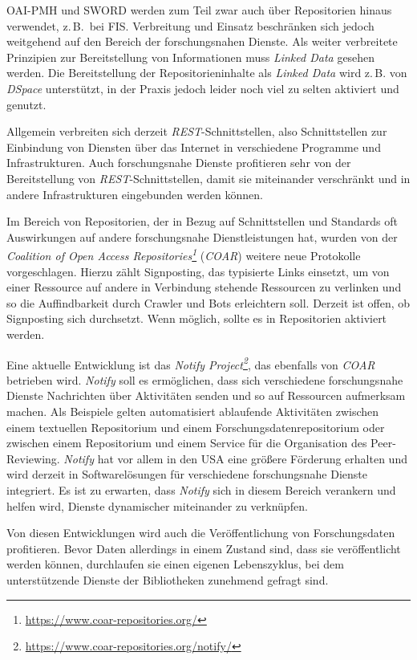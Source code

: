 \documentclass[
  11pt,
  letterpaper,
  DIV=11,
  twoside]{scrreprt}
\DeclareRobustCommand{\href}[2]{#2\footnote{\url{#1}}}
\begin{document}
{OAI-PMH} und {SWORD} werden zum Teil zwar auch über Repositorien hinaus
verwendet, z.\,B.~bei {FIS}. Verbreitung und Einsatz beschränken sich
jedoch weitgehend auf den Bereich der forschungsnahen Dienste. Als
weiter verbreitete Prinzipien zur Bereitstellung von Informationen muss
\emph{Linked Data} gesehen werden. Die Bereitstellung der
Repositorieninhalte als \emph{Linked Data} wird z.\,B. von \emph{DSpace}
unterstützt, in der Praxis jedoch leider noch viel zu selten aktiviert
und genutzt.

Allgemein verbreiten sich derzeit \emph{REST}-Schnittstellen, also
Schnittstellen zur Einbindung von Diensten über das Internet in
verschiedene Programme und Infrastrukturen. Auch forschungsnahe Dienste
profitieren sehr von der Bereitstellung von \emph{REST}-Schnittstellen,
damit sie miteinander verschränkt und in andere Infrastrukturen
eingebunden werden können.

Im Bereich von Repositorien, der in Bezug auf Schnittstellen und
Standards oft Auswirkungen auf andere forschungsnahe Dienstleistungen
hat, wurden von der
\emph{\href{https://www.coar-repositories.org/}{Coalition of Open Access
Repositories}} (\emph{COAR}) weitere neue Protokolle vorgeschlagen.
Hierzu zählt Signposting, das typisierte Links einsetzt, um von einer
Ressource auf andere in Verbindung stehende Ressourcen zu verlinken und
so die Auffindbarkeit durch Crawler und Bots erleichtern soll. Derzeit
ist offen, ob Signposting sich durchsetzt. Wenn möglich, sollte es in
Repositorien aktiviert werden.

Eine aktuelle Entwicklung ist das
\emph{\href{https://www.coar-repositories.org/notify/}{Notify Project}},
das ebenfalls von \emph{COAR} betrieben wird. \emph{Notify} soll es
ermöglichen, dass sich verschiedene forschungsnahe Dienste Nachrichten
über Aktivitäten senden und so auf Ressourcen aufmerksam machen. Als
Beispiele gelten automatisiert ablaufende Aktivitäten zwischen einem
textuellen Repositorium und einem Forschungsdatenrepositorium oder
zwischen einem Repositorium und einem Service für die Organisation des
Peer-Reviewing. \emph{Notify} hat vor allem in den USA eine größere
Förderung erhalten und wird derzeit in Softwarelösungen für verschiedene
forschungsnahe Dienste integriert. Es ist zu erwarten, dass
\emph{Notify} sich in diesem Bereich verankern und helfen wird, Dienste
dynamischer miteinander zu verknüpfen.

Von diesen Entwicklungen wird auch die Veröffentlichung von
Forschungsdaten profitieren. Bevor Daten allerdings in einem Zustand
sind, dass sie veröffentlicht werden können, durchlaufen sie einen
eigenen Lebenszyklus, bei dem unterstützende Dienste der Bibliotheken
zunehmend gefragt sind.
\end{document}
